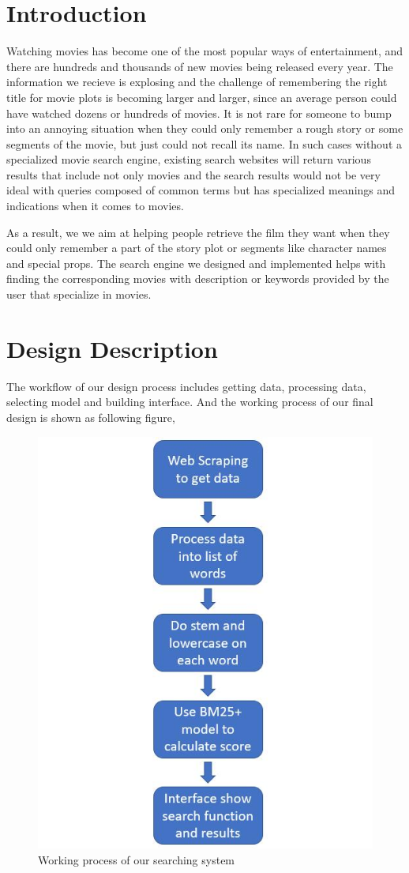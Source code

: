 \documentclass[sigconf,nonacm]{acmart}
\begin{document}
\section{Introduction}

Watching movies has become one of the most popular ways of entertainment, and there are hundreds and thousands of new movies being released every year. The information we recieve is explosing and the challenge of remembering the right title for movie plots is becoming larger and larger, since an average person could have watched dozens or hundreds of movies. It is not rare for someone to bump into an annoying situation when they could only remember a rough story or some segments of the movie, but just could not recall its name. In such cases without a specialized movie search engine, existing search websites will return various results that include not only movies and the search results would not be very ideal with queries composed of common terms but has specialized meanings and indications when it comes to movies.

As a result, we we aim at helping people retrieve the film they want when they could only remember a part of the story plot or segments like character names and special props. The search engine we designed and implemented helps with finding the corresponding movies with description or keywords provided by the user that specialize in movies.

\section{Design Description}

The workflow of our design process includes getting data, processing data, selecting model and building interface. And the working process of our final design is shown as following figure,

\begin{figure}[H]
  \centering
  \includegraphics[width=0.5\linewidth]{process.jpg}
  \caption{Working process of our searching system}
\end{figure}
\end{document}
